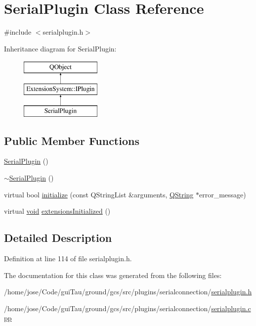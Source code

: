 \hypertarget{class_serial_plugin}{\section{Serial\-Plugin Class Reference}
\label{class_serial_plugin}
}


{\ttfamily \#include $<$serialplugin.\-h$>$}

Inheritance diagram for Serial\-Plugin\-:\begin{figure}[H]
\begin{center}
\leavevmode
\includegraphics[height=3.000000cm]{class_serial_plugin}
\end{center}
\end{figure}
\subsection*{Public Member Functions}
\begin{DoxyCompactItemize}
\item 
\hyperlink{group___serial_plugin_ga61918aa34cb91654613f5ae3e2992cb5}{Serial\-Plugin} ()
\item 
\hyperlink{group___serial_plugin_gaed0afbd615d41b58d07b4916f4c9e277}{$\sim$\-Serial\-Plugin} ()
\item 
virtual bool \hyperlink{group___serial_plugin_ga06e1847534162b254c0790b2221e2836}{initialize} (const Q\-String\-List \&arguments, \hyperlink{group___u_a_v_objects_plugin_gab9d252f49c333c94a72f97ce3105a32d}{Q\-String} $\ast$error\-\_\-message)
\item 
virtual \hyperlink{group___u_a_v_objects_plugin_ga444cf2ff3f0ecbe028adce838d373f5c}{void} \hyperlink{group___serial_plugin_ga513ef44cd1747f6859255f102fc9f845}{extensions\-Initialized} ()
\end{DoxyCompactItemize}


\subsection{Detailed Description}


Definition at line 114 of file serialplugin.\-h.



The documentation for this class was generated from the following files\-:\begin{DoxyCompactItemize}
\item 
/home/jose/\-Code/gui\-Tau/ground/gcs/src/plugins/serialconnection/\hyperlink{serialplugin_8h}{serialplugin.\-h}\item 
/home/jose/\-Code/gui\-Tau/ground/gcs/src/plugins/serialconnection/\hyperlink{serialplugin_8cpp}{serialplugin.\-cpp}\end{DoxyCompactItemize}
